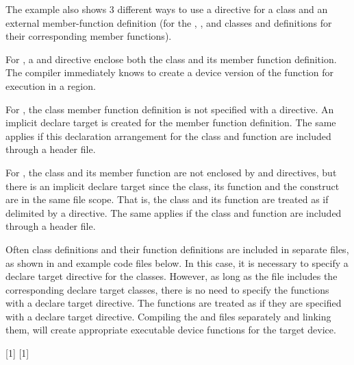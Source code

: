 \begin{cppspecific}

The example also shows 3 different ways to use a  directive for a 
class and an external member-function definition (for the , , 
and  classes and definitions for their corresponding  member functions).

For , a  and 
 directive
enclose both the class and its member function definition. The compiler immediately
knows to create a device version of the function for execution in a  region.

For , the class member function definition is not specified with a
 directive.
An implicit declare target is created for the member function definition.
The same applies if this declaration arrangement for the class and function 
are included through a header file.

For , the class and its member function are not enclosed by 
and  directives,
but there is an implicit declare target since the class, its function
and the  construct are in the same file scope. That is, the class
and its function are treated as if delimited by a  directive.
The same applies if the class and function are included through a header file.



Often class definitions and their function definitions are included in separate files,
as shown in  and  example code files below.
In this case, it is necessary to specify a declare target directive for the classes.
However, as long as the  file includes the corresponding declare target classes,
there is no need to specify the functions with a declare target directive.
The functions are treated as if they are specified with a declare target directive.
Compiling the  and  files 
separately and linking them, will create appropriate executable device functions for the target device.

\smallskip
{}[1]
\smallskip
{}[1]


\end{cppspecific}
